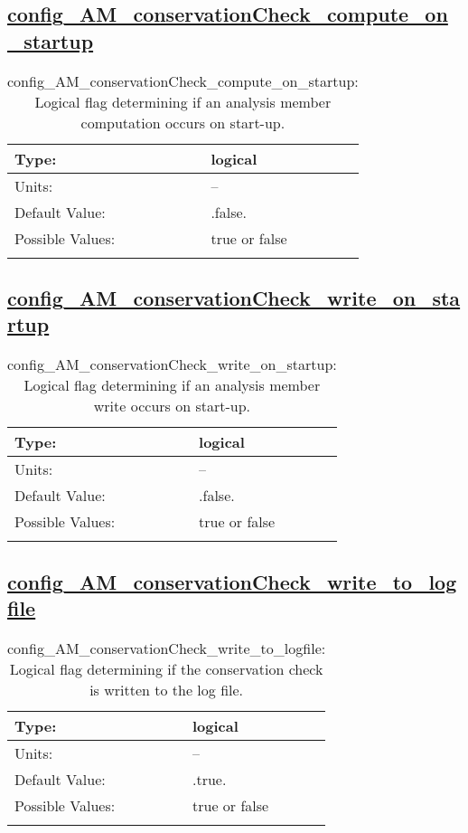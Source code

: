 \subsection[config\_AM\_conservationCheck\_compute\_on\_startup]{\hyperref[sec:nm_tab_AM_conservationCheck]{config\_AM\_conservationCheck\_compute\_on\_startup}}
\label{subsec:nm_sec_config_AM_conservationCheck_compute_on_startup}
\begin{center}
\begin{longtable}{| p{2.0in} || p{4.0in} |}
    \hline
    Type: & logical \\
    \hline
    Units: & -- \\
    \hline
    Default Value: & .false. \\
    \hline
    Possible Values: & true or false \\
    \hline
    \caption{config\_AM\_conservationCheck\_compute\_on\_startup: Logical flag determining if an analysis member computation occurs on start-up.}
\end{longtable}
\end{center}
\subsection[config\_AM\_conservationCheck\_write\_on\_startup]{\hyperref[sec:nm_tab_AM_conservationCheck]{config\_AM\_conservationCheck\_write\_on\_startup}}
\label{subsec:nm_sec_config_AM_conservationCheck_write_on_startup}
\begin{center}
\begin{longtable}{| p{2.0in} || p{4.0in} |}
    \hline
    Type: & logical \\
    \hline
    Units: & -- \\
    \hline
    Default Value: & .false. \\
    \hline
    Possible Values: & true or false \\
    \hline
    \caption{config\_AM\_conservationCheck\_write\_on\_startup: Logical flag determining if an analysis member write occurs on start-up.}
\end{longtable}
\end{center}
\subsection[config\_AM\_conservationCheck\_write\_to\_logfile]{\hyperref[sec:nm_tab_AM_conservationCheck]{config\_AM\_conservationCheck\_write\_to\_logfile}}
\label{subsec:nm_sec_config_AM_conservationCheck_write_to_logfile}
\begin{center}
\begin{longtable}{| p{2.0in} || p{4.0in} |}
    \hline
    Type: & logical \\
    \hline
    Units: & -- \\
    \hline
    Default Value: & .true. \\
    \hline
    Possible Values: & true or false \\
    \hline
    \caption{config\_AM\_conservationCheck\_write\_to\_logfile: Logical flag determining if the conservation check is written to the log file.}
\end{longtable}
\end{center}
